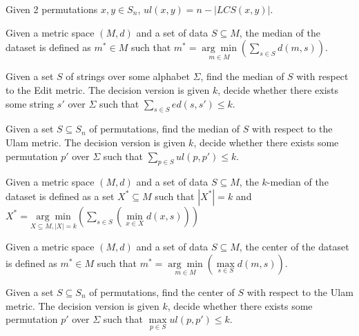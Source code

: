 \begin{theorem}
\label{LCSFormula}
    Given 2 permutations $x, y \in S_n$, $ul(x, y) = n - |LCS(x, y)|$.
\end{theorem}

\begin{definition}
\label{Median String}
   Given a metric space $(M, d)$ and a set of data $S \subseteq M$, the median of the dataset is defined as $m^* \in M$ such that $m^* = \underset{m \in M}{\arg \min} \left(\sum\limits_{s \in S} d(m, s)\right)$.
\end{definition}

\begin{definition}
\label{Edit Median}
    Given a set $S$ of strings over some alphabet $\Sigma$, find the median of $S$ with respect to the Edit metric. The decision version is given $k$, decide whether there exists some string $s'$ over $\Sigma$ such that $\sum\limits_{s \in S} ed(s, s') \leq k$.
\end{definition}

\begin{definition}
\label{Ulam Median}
    Given a set $S \subseteq S_n$ of permutations, find the median of $S$ with respect to the Ulam metric. The decision version is given $k$, decide whether there exists some permutation $p'$ over $\Sigma$ such that $\sum\limits_{p \in S} ul(p, p') \leq k$.
\end{definition}

\begin{definition}
\label{KMedian}
    Given a metric space $(M, d)$ and a set of data $S \subseteq M$, the $k$-median of the dataset is defined as a set $X^* \subseteq M$ such that $|X^*| = k$ and $X^* = \underset{X \subseteq M, |X| = k}{\arg \min} \left(\sum\limits_{s \in S} \left(\min\limits_{x \in X} d(x, s)\right) \right)$
\end{definition}

\begin{definition}
\label{Center String}
    Given a metric space $(M, d)$ and a set of data $S \subseteq M$, the center of the dataset is defined as $m^* \in M$ such that $m^* = \underset{m \in M}{\arg \min} \left(\max\limits_{s \in S} d(m, s)\right)$.
\end{definition}

\begin{definition}
\label{Ulam Center}
    Given a set $S \subseteq S_n$  of permutations, find the center of $S$ with respect to the Ulam metric. The decision version is given $k$, decide whether there exists some permutation $p'$ over $\Sigma$ such that $\max\limits_{p \in S} ul(p, p') \leq k$.
\end{definition}

